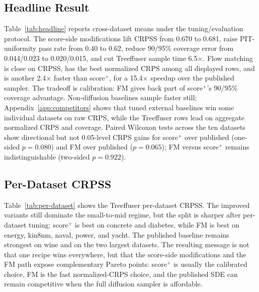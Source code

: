 \documentclass{uai2026}
\begin{document}
\subsection{Headline Result}\label{sec:headline}
Table~\ref{tab:headline} reports cross-dataset means under the tuning/evaluation protocol. The score-side modifications lift CRPSS from 0.670 to 0.681, raise PIT-uniformity pass rate from 0.40 to 0.62, reduce 90/95\% coverage error from 0.044/0.023 to 0.020/0.015, and cut Treeffuser sample time 6.5$\times$. Flow matching is close on CRPSS, has the best normalized CRPS among all displayed rows, and is another 2.4$\times$ faster than score$^+$, for a 15.4$\times$ speedup over the published sampler. The tradeoff is calibration: FM gives back part of score$^+$'s 90/95\% coverage advantage. Non-diffusion baselines sample faster still; Appendix~\ref{app:competitors} shows that tuned external baselines win some individual datasets on raw CRPS, while the Treeffuser rows lead on aggregate normalized CRPS and coverage. Paired Wilcoxon tests across the ten datasets show directional but not 0.05-level CRPS gains for score$^+$ over published (one-sided $p=0.080$) and FM over published ($p=0.065$); FM versus score$^+$ remains indistinguishable (two-sided $p=0.922$).

\subsection{Per-Dataset CRPSS}\label{sec:perdata}
Table~\ref{tab:per-dataset} shows the Treeffuser per-dataset CRPSS. The improved variants still dominate the small-to-mid regime, but the split is sharper after per-dataset tuning: score$^+$ is best on concrete and diabetes, while FM is best on energy, kin8nm, naval, power, and yacht. The published baseline remains strongest on wine and on the two largest datasets. The resulting message is not that one recipe wins everywhere, but that the score-side modifications and the FM path expose complementary Pareto points: score$^+$ is usually the calibrated choice, FM is the fast normalized-CRPS choice, and the published SDE can remain competitive when the full diffusion sampler is affordable.
\end{document}
